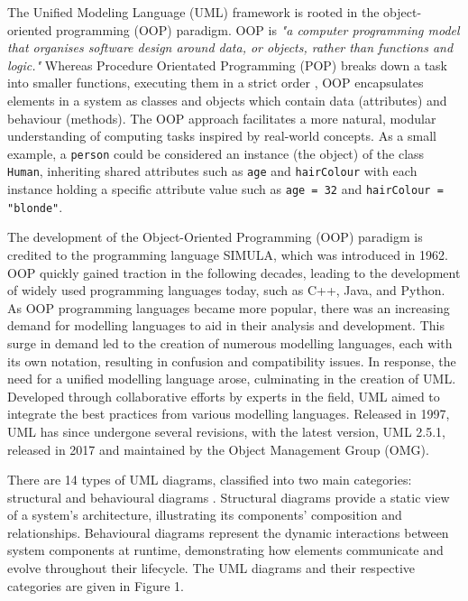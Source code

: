 \documentclass{article}
\begin{document}
{The Unified Modeling Language (UML) framework is rooted in the object-oriented programming (OOP) paradigm. OOP is \textit{"a computer programming model that organises software design around data, or objects, rather than functions and logic."}\cite{TechTargetOOP} Whereas Procedure Orientated Programming (POP) breaks down a task into smaller functions, executing them in a strict order \cite{OOPPOP}, OOP encapsulates elements in a system as classes and objects which contain data (attributes) and behaviour (methods)\cite{MediumOOPPOP}. The OOP approach facilitates a more natural, modular understanding of computing tasks inspired by real-world concepts\cite{Seidl_Scholz_Huemer_Kappel_Duffy_2014}. As a small example, a \texttt{person} could be considered an instance (the object) of the class \texttt{Human}, inheriting shared attributes such as \texttt{age} and \texttt{hairColour} with each instance holding a specific attribute value such as \texttt{age = 32} and \texttt{hairColour = "blonde"}.

The development of the Object-Oriented Programming (OOP) paradigm is credited to the programming language SIMULA, which was introduced in 1962\cite{Simula}. OOP quickly gained traction in the following decades, leading to the development of widely used programming languages today, such as C++, Java, and Python\cite{Seidl_Scholz_Huemer_Kappel_Duffy_2014}. As OOP programming languages became more popular, there was an increasing demand for modelling languages to aid in their analysis and development. This surge in demand led to the creation of numerous modelling languages, each with its own notation, resulting in confusion and compatibility issues\cite{Seidl_Scholz_Huemer_Kappel_Duffy_2014}. In response, the need for a unified modelling language arose, culminating in the creation of UML. Developed through collaborative efforts by experts in the field, UML aimed to integrate the best practices from various modelling languages\cite{Seidl_Scholz_Huemer_Kappel_Duffy_2014}. Released in 1997, UML has since undergone several revisions, with the latest version, UML 2.5.1, released in 2017 and maintained by the Object Management Group (OMG)\cite{OMG_UML}.

There are 14 types of UML diagrams, classified into two main categories: structural and behavioural diagrams \cite{Seidl_Scholz_Huemer_Kappel_Duffy_2014}. Structural diagrams provide a static view of a system's architecture, illustrating its components' composition and relationships. Behavioural diagrams represent the dynamic interactions between system components at runtime, demonstrating how elements communicate and evolve throughout their lifecycle. The UML diagrams and their respective categories are given in Figure 1.  

}
\end{document}
